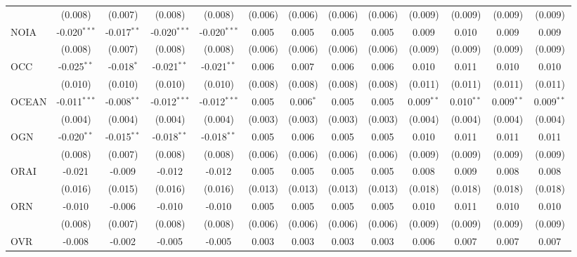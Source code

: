 \begin{table}[!htbp]
\begin{tabular}{@{\extracolsep{5pt}}lcccccccccccc}
  & (0.008) & (0.007) & (0.008) & (0.008) & (0.006) & (0.006) & (0.006) & (0.006) & (0.009) & (0.009) & (0.009) & (0.009) \\
 NOIA & -0.020$^{***}$ & -0.017$^{**}$ & -0.020$^{***}$ & -0.020$^{***}$ & 0.005$^{}$ & 0.005$^{}$ & 0.005$^{}$ & 0.005$^{}$ & 0.009$^{}$ & 0.010$^{}$ & 0.009$^{}$ & 0.009$^{}$ \\
  & (0.008) & (0.007) & (0.008) & (0.008) & (0.006) & (0.006) & (0.006) & (0.006) & (0.009) & (0.009) & (0.009) & (0.009) \\
 OCC & -0.025$^{**}$ & -0.018$^{*}$ & -0.021$^{**}$ & -0.021$^{**}$ & 0.006$^{}$ & 0.007$^{}$ & 0.006$^{}$ & 0.006$^{}$ & 0.010$^{}$ & 0.011$^{}$ & 0.010$^{}$ & 0.010$^{}$ \\
  & (0.010) & (0.010) & (0.010) & (0.010) & (0.008) & (0.008) & (0.008) & (0.008) & (0.011) & (0.011) & (0.011) & (0.011) \\
 OCEAN & -0.011$^{***}$ & -0.008$^{**}$ & -0.012$^{***}$ & -0.012$^{***}$ & 0.005$^{}$ & 0.006$^{*}$ & 0.005$^{}$ & 0.005$^{}$ & 0.009$^{**}$ & 0.010$^{**}$ & 0.009$^{**}$ & 0.009$^{**}$ \\
  & (0.004) & (0.004) & (0.004) & (0.004) & (0.003) & (0.003) & (0.003) & (0.003) & (0.004) & (0.004) & (0.004) & (0.004) \\
 OGN & -0.020$^{**}$ & -0.015$^{**}$ & -0.018$^{**}$ & -0.018$^{**}$ & 0.005$^{}$ & 0.006$^{}$ & 0.005$^{}$ & 0.005$^{}$ & 0.010$^{}$ & 0.011$^{}$ & 0.011$^{}$ & 0.011$^{}$ \\
  & (0.008) & (0.007) & (0.008) & (0.008) & (0.006) & (0.006) & (0.006) & (0.006) & (0.009) & (0.009) & (0.009) & (0.009) \\
 ORAI & -0.021$^{}$ & -0.009$^{}$ & -0.012$^{}$ & -0.012$^{}$ & 0.005$^{}$ & 0.005$^{}$ & 0.005$^{}$ & 0.005$^{}$ & 0.008$^{}$ & 0.009$^{}$ & 0.008$^{}$ & 0.008$^{}$ \\
  & (0.016) & (0.015) & (0.016) & (0.016) & (0.013) & (0.013) & (0.013) & (0.013) & (0.018) & (0.018) & (0.018) & (0.018) \\
 ORN & -0.010$^{}$ & -0.006$^{}$ & -0.010$^{}$ & -0.010$^{}$ & 0.005$^{}$ & 0.005$^{}$ & 0.005$^{}$ & 0.005$^{}$ & 0.010$^{}$ & 0.011$^{}$ & 0.010$^{}$ & 0.010$^{}$ \\
  & (0.008) & (0.007) & (0.008) & (0.008) & (0.006) & (0.006) & (0.006) & (0.006) & (0.009) & (0.009) & (0.009) & (0.009) \\
 OVR & -0.008$^{}$ & -0.002$^{}$ & -0.005$^{}$ & -0.005$^{}$ & 0.003$^{}$ & 0.003$^{}$ & 0.003$^{}$ & 0.003$^{}$ & 0.006$^{}$ & 0.007$^{}$ & 0.007$^{}$ & 0.007$^{}$ \\

\end{tabular}
\end{table}
